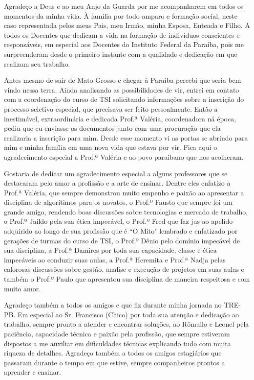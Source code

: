
\begin{agradecimentos}[AGRADECIMENTOS]

    Agradeço a Deus e ao meu Anjo da Guarda  por me acompanharem em todos os momentos da minha vida. 
    À família por todo amparo e formação social, neste caso representada pelos meus Pais, meu Irmão, minha Esposa, Enteada e Filho. 
    A todos os Docentes que dedicam a vida na formação de indivíduos conscientes e responsáveis, em especial aos Docentes do Instituto Federal da Paraíba, pois me surpreenderam desde o primeiro instante com a qualidade e dedicação em que realizam seu trabalho.

    Antes mesmo de sair de Mato Grosso e chegar à Paraíba percebi que seria bem vindo nessa terra. Ainda analisando as possibilidades de vir, entrei em contato com a coordenação do curso de TSI solicitando informações sobre a inscrição do processo seletivo especial, que precisava ser feito pessoalmente. Então a inestimável, extraordinária e dedicada Prof.ª Valéria, coordenadora ná época, pediu que eu enviasse os documentos junto com uma procuração que ela realizaria a inscrição para mim. Desde esse momento vi as portas se abrindo para mim e minha família em uma nova vida que estava por vir. Fica aqui o agradecimento especial a Prof.ª Valéria e ao povo paraibano que nos acolheram.

    Gostaria de dedicar um agradecimento especial a alguns professores que se destacaram pelo amor a profissão e a arte de ensinar. Dentre eles enfatizo a Prof.ª Valéria, que sempre demonstrou muito empenho e paixão ao apresentar a disciplina de algorítimos para os novatos, o Prof.º Fausto que sempre foi um grande amigo, rendendo boas discussões sobre tecnologias e mercado de trabalho, o Prof.º Jaildo pela sua ética impecável, o Prof.º Fred que faz jus ao apelido adquirido ao longo de sua profissão que é ``O Mito" \space lembrado e enfatizado por gerações de turmas do curso de TSI, o Prof.º Dênio pelo domínio impecável de sua disciplina, a Prof.ª Damires por toda sua capacidade, classe e ética impecáveis ao conduzir suas aulas, a Prof.ª Heremita e Prof.ª Nadja pelas calorosas discussões sobre gestão, analise e execução de projetos em suas aulas e também o Prof.º Paulo que apresentou sua disciplina de maneira respeitosa e com muito amor.
    
    Agradeço também a todos os amigos e que fiz durante minha jornada no TRE-PB. Em especial ao Sr. Francisco (Chico) por toda sua atenção e dedicação ao trabalho, sempre pronto a atender e encontrar soluções, ao Rômullo e Leonel pela paciência, capacidade técnica e paixão pela profissão, que sempre estiveram dispostos a me auxiliar em dificuldades técnicas explicando tudo com muita riqueza de detalhes. Agradeço também a todos os amigos estagiários que passaram durante o tempo em que estive, sempre companheiros prontos a aprender e ensinar.

\end{agradecimentos}
